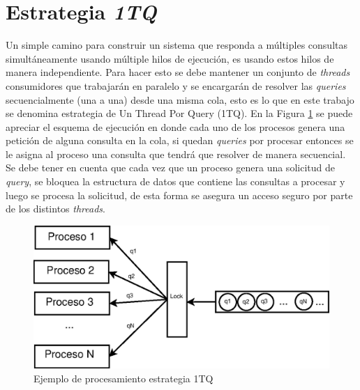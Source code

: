 \section{Estrategia \textit{1TQ}}
\label{scheduling:baseline}
Un simple camino para construir un sistema que responda a múltiples consultas simultáneamente usando múltiple hilos de ejecución, es usando estos hilos de manera independiente. Para hacer esto se debe mantener un conjunto de \textit{threads} consumidores que trabajarán en paralelo y se encargarán de resolver las \textit{queries} secuencialmente (una a una) desde una misma cola, esto es lo que en este trabajo se denomina estrategia de Un Thread Por Query (1TQ). En la Figura \ref{fig:1TQ} se puede apreciar el esquema de ejecución en donde cada uno de los procesos genera una petición de alguna consulta en la cola, si quedan \textit{queries} por procesar entonces se le asigna al proceso una consulta que tendrá que resolver de manera secuencial. Se debe tener en cuenta que cada vez que un proceso genera una solicitud de \textit{query}, se bloquea la estructura de datos que contiene las consultas a procesar y luego se procesa la solicitud, de esta forma se asegura un acceso seguro por parte de los distintos \textit{threads}. 

\begin{figure}[H]
\centering
\includegraphics[scale=.75]{images/1TQ.eps}
\caption{Ejemplo de procesamiento estrategia 1TQ}
\label{fig:1TQ}
\end{figure}


